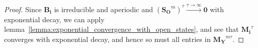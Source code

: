 \documentclass[../../main.tex]{subfiles}
\begin{document}
\begin{proof}
        Since $\bm{B_i}$ is irreducible and aperiodic and $(\bm{S_O}^{m})^\tau \xrightarrow{\tau \to \infty} \bm{0}$ with exponential decay, we can apply lemma~\ref{lemma:exponential_convergence_with_open_states}, and see that $\bm{M_i}^\tau$ converges with exponential decay, and hence so must all entries in $\bm{M_Y}^{m \tau}$.
    \end{proof}
\end{document}
